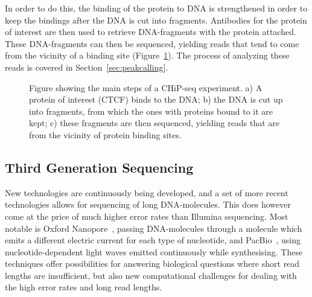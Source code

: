In order to do this, the binding of the protein to DNA is strengthened in order to keep the bindings after the DNA is cut into fragments.
Antibodies for the protein of interest are then used to retrieve DNA-fragments with the protein attached.
These DNA-fragments can then be sequenced, yielding reads that tend to come from the vicinity of a binding site (Figure~\ref{fig:chipseq}). The process of analyzing these reads is covered in Section~\ref{sec:peakcalling}.
\begin{figure}

\caption{
  Figure showing the main steps of a CHiP-seq experiment. a) A protein of interest (CTCF) binds to the DNA; b) the DNA is cut up into fragments, from which the ones with proteins bound to it are kept; c) these fragments are then sequenced, yielding reads that are from the vicinity of protein binding sites.}
\label{fig:chipseq}
\end{figure}
\subsection{Third Generation Sequencing}
New technologies are continuously being developed, and a set of more recent technologies allows for sequencing of long DNA-molecules. This does however come at the price of much higher error rates than Illumina sequencing. Most notable is Oxford Nanopore~\cite{nanopore}, passing DNA-molecules through a molecule which emits a different electric current for each type of nucleotide, and PacBio~\cite{pacbio}, using  nucleotide-dependent light waves emitted continuously while synthesising.
These techniques offer possibilities for answering biological questions where short read lengths are insufficient, but also new computational challenges for dealing with the high error rates and long read lengths. 

